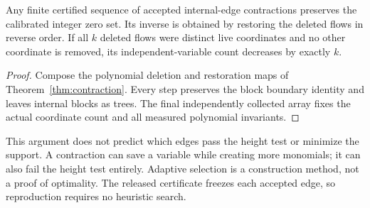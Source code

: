 \begin{corollary}\label{cor:contractionsequence}
Any finite certified sequence of accepted internal-edge contractions
preserves the calibrated integer zero set. Its inverse is obtained by
restoring the deleted flows in reverse order. If all $k$ deleted flows
were distinct live coordinates and no other coordinate is removed, its
independent-variable count decreases by exactly $k$.
\end{corollary}
\begin{proof}
Compose the polynomial deletion and restoration maps of
Theorem~\ref{thm:contraction}. Every step preserves the block boundary
identity and leaves internal blocks as trees. The final independently
collected array fixes the actual coordinate count and all measured
polynomial invariants.
\end{proof}

This argument does not predict which edges pass the height test or
minimize the support. A contraction can save a variable while creating
more monomials; it can also fail the height test entirely. Adaptive
selection is a construction method, not a proof of optimality. The
released certificate freezes each accepted edge, so reproduction requires
no heuristic search.
